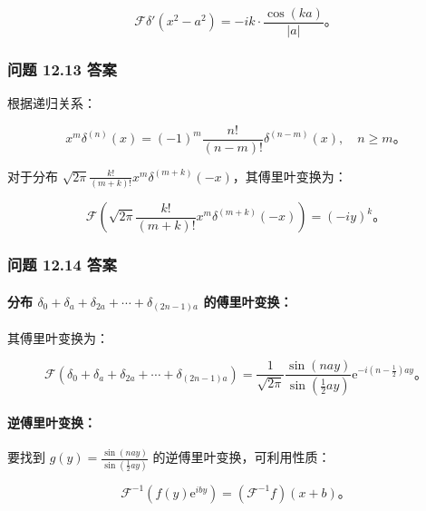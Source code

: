 \[\mathcal{F}\delta\prime\left( x^{2} - a^{2} \right) = - ik \cdot \frac{\cos(ka)}{|a|}。\]

\subsubsection{问题 12.13 答案}\label{ux95eeux9898-12.13-ux7b54ux6848}

根据递归关系：

\[x^{m}\delta^{(n)}(x) = ( - 1)^{m}\frac{n!}{(n - m)!}\delta^{(n - m)}(x),\quad n \geq m。\]

对于分布
\(\sqrt{2\pi}\frac{k!}{(m + k)!}x^{m}\delta^{(m + k)}( - x)\)，其傅里叶变换为：

\[\mathcal{F}\left( \sqrt{2\pi}\frac{k!}{(m + k)!}x^{m}\delta^{(m + k)}( - x) \right) = ( - iy)^{k}。\]

\subsubsection{问题 12.14 答案}\label{ux95eeux9898-12.14-ux7b54ux6848}

\paragraph{\texorpdfstring{分布
\(\delta_{0} + \delta_{a} + \delta_{2a} + \cdots + \delta_{(2n - 1)a}\)
的傅里叶变换：}{分布 \textbackslash delta\_\{0\} + \textbackslash delta\_\{a\} + \textbackslash delta\_\{2a\} + \textbackslash cdots + \textbackslash delta\_\{(2n - 1)a\} 的傅里叶变换：}}\label{ux5206ux5e03-delta_0-delta_a-delta_2a-cdots-delta_2n-1a-ux7684ux5085ux91ccux53f6ux53d8ux6362}

其傅里叶变换为：

\[\mathcal{F}\left( \delta_{0} + \delta_{a} + \delta_{2a} + \cdots + \delta_{(2n - 1)a} \right) = \frac{1}{\sqrt{2\pi}}\frac{\sin(nay)}{\sin\left( \frac{1}{2}ay \right)}\mathrm{e}^{- i\left( n - \frac{1}{2} \right)ay}。\]

\paragraph{逆傅里叶变换：}\label{ux9006ux5085ux91ccux53f6ux53d8ux6362}

要找到 \(g(y) = \frac{\sin(nay)}{\sin\left( \frac{1}{2}ay \right)}\)
的逆傅里叶变换，可利用性质：

\[\mathcal{F}^{- 1}\left( f(y)\mathrm{e}^{iby} \right) = \left( \mathcal{F}^{- 1}f \right)(x + b)。\]

